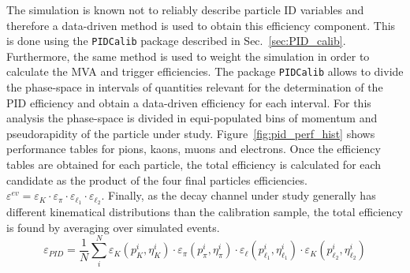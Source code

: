 The simulation is known not to reliably describe particle ID variables
and therefore a data-driven method is used to obtain this efficiency component.
This is done using the \verb!PIDCalib! package described in Sec.~\ref{sec:PID_calib}.
Furthermore, the same method is used to weight the simulation in order to calculate the MVA and trigger efficiencies.
The package \verb!PIDCalib! allows to divide the phase-space in intervals of quantities relevant for the determination 
of the PID efficiency and obtain a data-driven efficiency for each interval. For this analysis the phase-space
is divided in equi-populated bins of momentum and pseudorapidity of the particle under study.
Figure~\ref{fig:pid_perf_hist} shows performance tables for pions, kaons, muons and electrons.
Once the efficiency tables are obtained for each particle, the total efficiency
is calculated for each candidate as the product of the four final particles efficiencies.
$\varepsilon^{ev} = \varepsilon_K\cdot\varepsilon_\pi\cdot\varepsilon_{\ell_1}\cdot\varepsilon_{\ell_2}$.
Finally, as the decay channel under study generally has different kinematical distributions than the calibration sample,
the total efficiency is found by averaging over simulated events.
%
\begin{equation}
\varepsilon_{PID} = \frac{1}{N} \sum_i^N \varepsilon_K(p_K^i,\eta_K^i) \cdot \varepsilon_\pi(p_\pi^i,\eta_\pi^i) \cdot \varepsilon_\ell(p_{\ell_1}^i,\eta_{\ell_1}^i) \cdot \varepsilon_K(p_{\ell_2}^i,\eta_{\ell_2}^i)
\end{equation}
%
